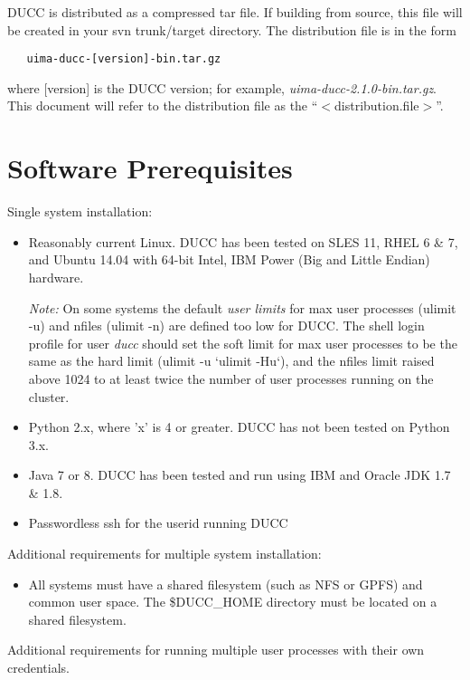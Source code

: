 DUCC is distributed as a compressed tar file.  If building from source, this file will be created in your svn
trunk/target directory. The distribution file is in the form
\begin{verbatim}
   uima-ducc-[version]-bin.tar.gz
\end{verbatim}
where [version] is the DUCC version; for example, {\em uima-ducc-2.1.0-bin.tar.gz}.  This document will refer to the distribution
file as the ``$<$distribution.file$>$''.

\section{Software Prerequisites}
\label{sec:install.prerequisites}

Single system installation:

\begin{itemize}
  \item Reasonably current Linux.  DUCC has been tested on SLES 11, RHEL 6 \& 7, and Ubuntu 14.04 
    with 64-bit Intel, IBM Power (Big and Little Endian) hardware.
    
    {\em Note:} On some systems the default {\em user limits}
    for max user processes (ulimit -u) and nfiles (ulimit -n) are defined too
    low for DUCC. The shell login profile for user {\em ducc} should set the
    soft limit for max user processes to be the same as the hard limit
    (ulimit -u `ulimit -Hu`), and
    the nfiles limit raised above 1024 to at least twice the number of user
    processes running on the cluster.

  \item Python 2.x, where 'x' is 4 or greater.  DUCC has not been tested on Python 3.x.
  \item Java 7 or 8. DUCC has been tested and run using IBM and Oracle JDK 1.7 \& 1.8.
  \item Passwordless ssh for the userid running DUCC
\end{itemize}
  
Additional requirements for multiple system installation:

\begin{itemize}
  \item All systems must have a shared filesystem (such as NFS or GPFS) and common user space.
        The \$DUCC\_HOME directory must be located on a shared filesystem.
\end{itemize}
  
Additional requirements for running multiple user processes with their own credentials.

